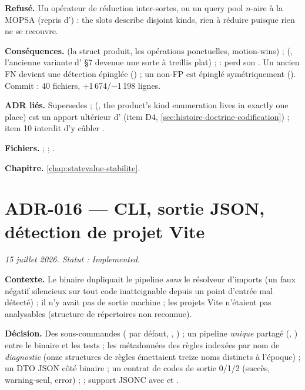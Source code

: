 \textbf{Refusé.} Un opérateur de réduction inter-sortes, ou un \og query
pool\fg{} $n$-aire à la MOPSA (repris d') : \og the slots describe
disjoint kinds\fg{}, rien à réduire puisque rien ne se recouvre.

\textbf{Conséquences.}  (la struct
produit, les opérations ponctuelles,  \og motion-wins\fg{}) ;
 (, l'ancienne variante
 d' §7 devenue une sorte à treillis plat) ;
 :  perd son .
Un ancien FN devient une détection épinglée
() ;
un non-FP est épinglé symétriquement
().
Commit  : 40 fichiers, +1\,674/$-$1\,198 lignes.

\textbf{ADR liés.} Supersedes  ;  (,
\og the product's kind enumeration lives in exactly one place\fg{}) est un
apport ultérieur d' (item D4, \cref{sec:histoire-doctrine-codification}) ;
 item 10 interdit d'y câbler .

\textbf{Fichiers.}  ;  ;
.

\textbf{Chapitre.} \cref{chap:statevalue-stabilite}.

\section{ADR-016 --- CLI, sortie JSON, détection de projet Vite}
\label{adr:16}
\noindent\textit{15 juillet 2026. Statut : Implemented.}

\textbf{Contexte.} Le binaire dupliquait le pipeline \emph{sans} le résolveur
d'imports (un faux négatif silencieux sur tout code inatteignable depuis un
point d'entrée mal détecté) ; il n'y avait pas de sortie machine ; les projets
Vite n'étaient pas analysables (structure de répertoires non reconnue).

\textbf{Décision.} Des sous-commandes ( par défaut, ,
) ; un pipeline \emph{unique} partagé
(, ) entre le binaire et les tests ;
les métadonnées des règles indexées par nom de \emph{diagnostic} (onze
structures de règles émettaient treize noms distincts à l'époque) ; un DTO
JSON côté binaire ; un contrat de codes de sortie 0/1/2 (succès, warning-seul,
error) ;  ; support  JSONC
avec  et .

